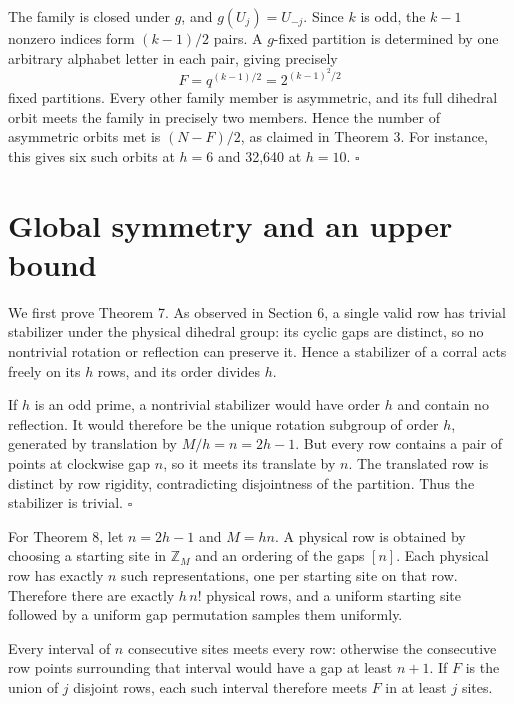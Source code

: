 \documentclass[11pt,a4paper]{article}
\begin{document}
The family is closed under \(g\), and \(g(U_j)=U_{-j}\). Since \(k\) is odd, the \(k-1\) nonzero indices form \((k-1)/2\) pairs. A \(g\)-fixed partition is determined by one arbitrary alphabet letter in each pair, giving precisely \[
 F=q^{(k-1)/2}=2^{(k-1)^2/2}
\] fixed partitions. Every other family member is asymmetric, and its full dihedral orbit meets the family in precisely two members. Hence the number of asymmetric orbits met is \((N-F)/2\), as claimed in Theorem 3. For instance, this gives six such orbits at \(h=6\) and 32,640 at \(h=10\). \(\square\)

\hypertarget{global-symmetry-and-an-upper-bound}{%
\section{Global symmetry and an upper bound}\label{global-symmetry-and-an-upper-bound}}

We first prove Theorem 7. As observed in Section 6, a single valid row has trivial stabilizer under the physical dihedral group: its cyclic gaps are distinct, so no nontrivial rotation or reflection can preserve it. Hence a stabilizer of a corral acts freely on its \(h\) rows, and its order divides \(h\).

If \(h\) is an odd prime, a nontrivial stabilizer would have order \(h\) and contain no reflection. It would therefore be the unique rotation subgroup of order \(h\), generated by translation by \(M/h=n=2h-1\). But every row contains a pair of points at clockwise gap \(n\), so it meets its translate by \(n\). The translated row is distinct by row rigidity, contradicting disjointness of the partition. Thus the stabilizer is trivial. \(\square\)

For Theorem 8, let \(n=2h-1\) and \(M=hn\). A physical row is obtained by choosing a starting site in \(\mathbb Z_M\) and an ordering of the gaps \([n]\). Each physical row has exactly \(n\) such representations, one per starting site on that row. Therefore there are exactly \(h\,n!\) physical rows, and a uniform starting site followed by a uniform gap permutation samples them uniformly.

Every interval of \(n\) consecutive sites meets every row: otherwise the consecutive row points surrounding that interval would have a gap at least \(n+1\). If \(F\) is the union of \(j\) disjoint rows, each such interval therefore meets \(F\) in at least \(j\) sites.
\end{document}
